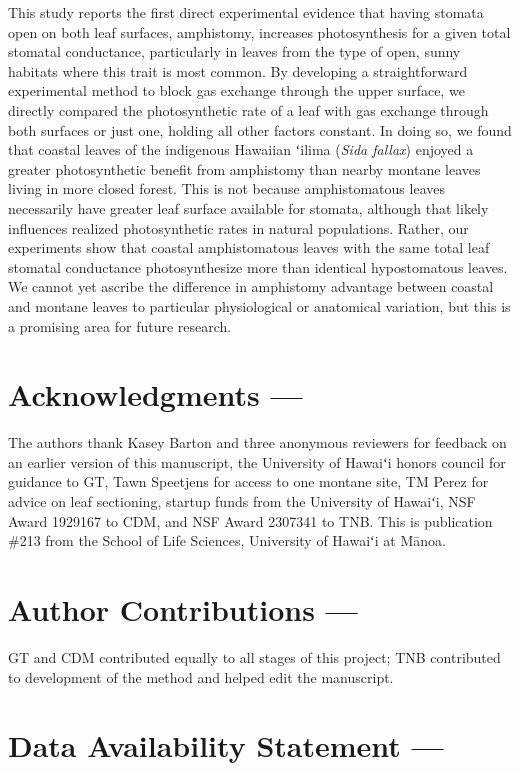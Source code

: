 \documentclass[
  letterpaper,
  DIV=11,
  numbers=noendperiod]{scrartcl}
\begin{document}
This study reports the first direct experimental evidence that having
stomata open on both leaf surfaces, amphistomy, increases photosynthesis
for a given total stomatal conductance, particularly in leaves from the
type of open, sunny habitats where this trait is most common. By
developing a straightforward experimental method to block gas exchange
through the upper surface, we directly compared the photosynthetic rate
of a leaf with gas exchange through both surfaces or just one, holding
all other factors constant. In doing so, we found that coastal leaves of
the indigenous Hawaiian ʻilima (\emph{Sida fallax}) enjoyed a greater
photosynthetic benefit from amphistomy than nearby montane leaves living
in more closed forest. This is not because amphistomatous leaves
necessarily have greater leaf surface available for stomata, although
that likely influences realized photosynthetic rates in natural
populations. Rather, our experiments show that coastal amphistomatous
leaves with the same total leaf stomatal conductance photosynthesize
more than identical hypostomatous leaves. We cannot yet ascribe the
difference in amphistomy advantage between coastal and montane leaves to
particular physiological or anatomical variation, but this is a
promising area for future research.

\hypertarget{acknowledgments}{%
\section{Acknowledgments ---}\label{acknowledgments}}

The authors thank Kasey Barton and three anonymous reviewers for
feedback on an earlier version of this manuscript, the University of
Hawaiʻi honors council for guidance to GT, Tawn Speetjens for access to
one montane site, TM Perez for advice on leaf sectioning, startup funds
from the University of Hawaiʻi, NSF Award 1929167 to CDM, and NSF Award
2307341 to TNB. This is publication \#213 from the School of Life
Sciences, University of Hawaiʻi at Mānoa.

\hypertarget{author-ontributions}{%
\section{Author Contributions ---}\label{author-ontributions}}

GT and CDM contributed equally to all stages of this project; TNB
contributed to development of the method and helped edit the manuscript.

\hypertarget{data-availability-statement}{%
\section{Data Availability Statement
---}\label{data-availability-statement}}
\end{document}
